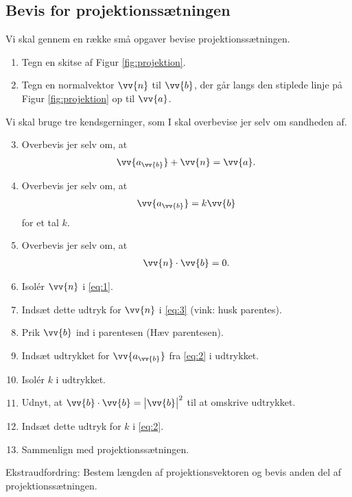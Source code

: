 \subsection*{Bevis for projektionssætningen}
Vi skal gennem en række små opgaver bevise projektionssætningen. 
\begin{enumerate}[label=\roman*)]
	\item Tegn en skitse af Figur \ref{fig:projektion}.
	\item Tegn en normalvektor $\vv{n}$ til $\vv{b}$, der går langs den stiplede linje på Figur \ref{fig:projektion} op til $\vv{a}$.
\end{enumerate}
Vi skal bruge tre kendsgerninger, som I skal overbevise jer selv om sandheden af.
\begin{enumerate}[label=\roman*)]
	\setcounter{enumi}{2}
	\item Overbevis jer selv om, at 
	\begin{align}\label{eq:1}
		\vv{a_{\vv{b}}} + \vv{n} = \vv{a}.
	\end{align}	 
	\item Overbevis jer selv om, at
	\begin{align}\label{eq:2}
		\vv{a_{\vv{b}}} = k \vv{b}
	\end{align}	  
	for et tal $k$.
	\item Overbevis jer selv om, at
	\begin{align}\label{eq:3}
		\vv{n} \cdot \vv{b} = 0.
	\end{align}	
	\item Isolér $\vv{n}$ i \eqref{eq:1}.
	\item Indsæt dette udtryk for $\vv{n}$ i \eqref{eq:3} (vink: husk parentes).
	\item Prik $\vv{b}$ ind i parentesen (Hæv parentesen). 
	\item Indsæt udtrykket for $\vv{a_{\vv{b}}}$ fra \eqref{eq:2} i udtrykket.
	\item Isolér $k$ i udtrykket. 
	\item Udnyt, at $\vv{b}\cdot\vv{b} = \big|\vv{b}\big|^2$ til at omskrive udtrykket.
	\item Indsæt dette udtryk for $k$ i \eqref{eq:2}.
	\item Sammenlign med projektionssætningen.
\end{enumerate}

Ekstraudfordring: Bestem længden af projektionsvektoren og bevis anden del af projektionssætningen.
